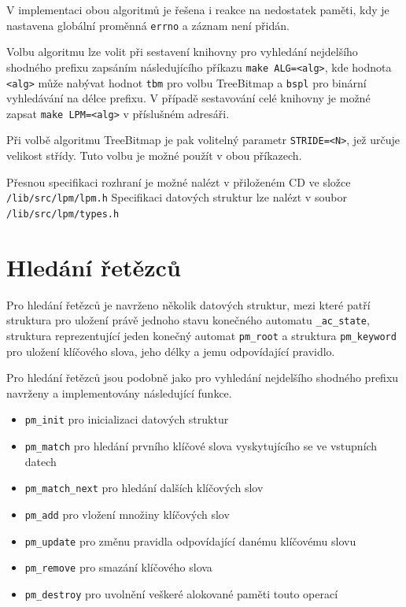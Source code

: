 V implementaci obou algoritmů je řešena i reakce na nedostatek paměti,
kdy je nastavena globální proměnná \texttt{errno} a záznam není přidán.

Volbu algoritmu lze volit při sestavení knihovny pro vyhledání nejdelšího shodného prefixu
zapsáním následujícího příkazu \texttt{make ALG=<alg>}, kde hodnota \texttt{<alg>} může nabývat
hodnot \texttt{tbm} pro volbu TreeBitmap a \texttt{bspl} pro binární vyhledávání na délce prefixu.
V případě sestavování celé knihovny je možné zapsat \texttt{make LPM=<alg>} v příslušném adresáři.

Při volbě algoritmu TreeBitmap je pak volitelný parametr \texttt{STRIDE=<N>}, jež určuje velikost
střídy. Tuto volbu je možné použít v obou příkazech.

Přesnou specifikaci rozhraní je možné nalézt v přiloženém CD ve složce \texttt{/lib/src/lpm/lpm.h}
Specifikaci datových struktur lze nalézt v soubor \texttt{/lib/src/lpm/types.h}


\section{Hledání řetězců}\label{api:pm} %

Pro hledání řetězců je navrženo několik datových struktur, mezi které patří
struktura pro uložení právě jednoho stavu konečného automatu \texttt{\_ac\_state},
struktura reprezentující jeden konečný automat \texttt{pm\_root} a struktura \texttt{pm\_keyword}
pro uložení klíčového slova, jeho délky a jemu odpovídající pravidlo.


Pro hledání řetězců jsou podobně jako pro vyhledání nejdelšího shodného prefixu navrženy a implementovány
následující funkce.

\begin{itemize}
    \item{\texttt{pm\_init} pro inicializaci datových struktur}
    \item{\texttt{pm\_match} pro hledání prvního klíčové slova vyskytujícího se ve vstupních datech}
    \item{\texttt{pm\_match\_next} pro hledání dalších klíčových slov}
    \item{\texttt{pm\_add} pro vložení množiny klíčových slov}
    \item{\texttt{pm\_update} pro změnu pravidla odpovídající danému klíčovému slovu}
    \item{\texttt{pm\_remove} pro smazání klíčového slova}
    \item{\texttt{pm\_destroy} pro uvolnění veškeré alokované paměti touto operací}
\end{itemize}

